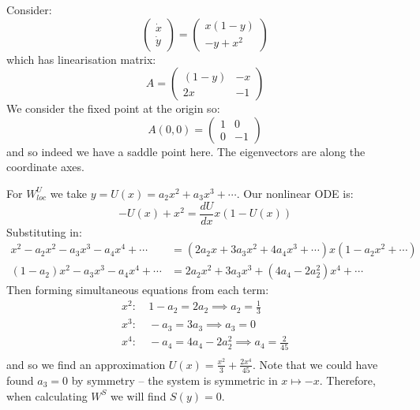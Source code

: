 \documentclass[../Main.tex]{subfiles}
\begin{document}
\begin{example}
    Consider:
    \begin{equation*}
        \begin{pmatrix}\dot{x} \\ \dot{y}\end{pmatrix} = \begin{pmatrix}x(1-y) \\ -y + x^2\end{pmatrix}
    \end{equation*}
    which has linearisation matrix:
    \begin{equation*}
        A =
        \begin{pmatrix}
            (1-y) & -x \\
            2x & -1
        \end{pmatrix}
    \end{equation*}
    We consider the fixed point at the origin so:
    \begin{equation*}
        A(0, 0) = 
        \begin{pmatrix}
            1 & 0 \\
            0 & -1
        \end{pmatrix}
    \end{equation*}
    and so indeed we have a saddle point here. The eigenvectors are along the coordinate axes.

    For $W^U_{loc}$ we take $y = U(x) = a_2 x^2 + a_3 x^3 + \cdots$. Our nonlinear ODE is:
    \begin{equation*}
        -U(x) + x^2 = \frac{dU}{dx} x (1-U(x))
    \end{equation*}
    Substituting in:
    \begin{align*}
        x^2 - a_2 x^2 - a_3 x^3 - a_4 x^4 + \cdots &= \left(2 a_2 x + 3 a_3 x^2 + 4 a_4 x^3 + \cdots\right) x \left(1 - a_2 x^2 + \cdots\right) \\
        (1 - a_2) x^2 - a_3 x^3 - a_4 x^4 + \cdots &= 2 a_2 x^2  + 3a_3 x^3 + (4a_4 - 2a_2^2) x^4 + \cdots
    \end{align*}
    Then forming simultaneous equations from each term:
    \begin{align*}
        x^2 :&~1 - a_2 = 2 a_2 \implies a_2 = \frac13 \\
        x^3 :&~-a_3 = 3 a_3 \implies a_3 = 0 \\
        x^4 :&~-a_4 = 4 a_4 - 2 a_2^2 \implies a_4 = \frac2{45} \\
    \end{align*}
    and so we find an approximation $U(x) = \frac{x^2}{3} + \frac{2x^4}{45}$. Note that we could have found $a_3 = 0$ by symmetry -- the system is symmetric in $x \mapsto -x$. Therefore, when calculating $W^S$ we will find $S(y) = 0$.
\end{example}
\end{document}
